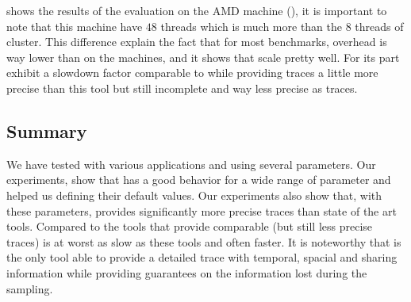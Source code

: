  shows the results of the evaluation on the AMD machine
(\Idfreeze), it is important to note that this machine have $48$ threads which
is much more than the $8$ threads of \Edel cluster. This difference explain
the fact that for most benchmarks, \Moca overhead is way lower than on the
\Edel machines, and it shows that \Moca scale pretty well.
For its part \MemProf exhibit a slowdown factor comparable to \Mitos while
providing traces a little more precise than this tool but still incomplete and
way less precise as \Moca traces.


\subsection{Summary}
\label{sec:expe-cncl}

We have tested \Moca with various applications and using several parameters.
Our experiments, show that \Moca has a good behavior for a wide range of
parameter and helped us defining their default values. Our experiments also
show that, with these parameters, provides significantly more precise traces
than state of the art tools. Compared to the tools that provide comparable
(but still less precise traces) \Moca is at worst as slow as these tools and
often faster.  It is noteworthy that \Moca is the only tool able to provide a
detailed trace with temporal, spacial and sharing information while providing
guarantees on the information lost during the sampling.
